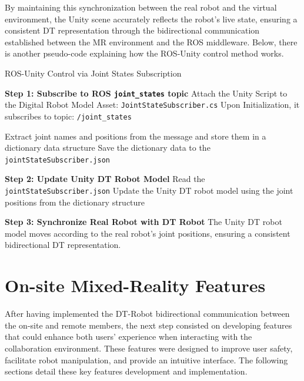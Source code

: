     By maintaining this synchronization between the real robot and the virtual environment, the Unity scene accurately reflects the robot's live state, ensuring a consistent \ac{DT} representation through the bidirectional communication established between the \ac{MR} environment and the \ac{ROS} middleware. Below, there is another pseudo-code explaining how the \ac{ROS}-Unity control method works.


    \begin{algorithm}
        \caption{ROS-Unity Control via Joint States Subscription}\label{alg:ros_unity_control}
        \begin{algorithmic}[1]
            \State \textbf{Step 1: Subscribe to ROS \texttt{joint\_states} topic}
            \State Attach the Unity Script to the Digital Robot Model Asset: \texttt{JointStateSubscriber.cs}
            \State Upon Initialization, it subscribes to topic: \texttt{/joint\_states}
    
                \State Extract joint names and positions from the message and store them in a dictionary data structure
                \State Save the dictionary data to the \texttt{jointStateSubscriber.json}
            \EndWhile
    
            \State \textbf{Step 2: Update Unity \ac{DT} Robot Model}
                \State Read the \texttt{jointStateSubscriber.json}
                \State Update the Unity \ac{DT} robot model using the joint positions from the dictionary structure
            \EndWhile
    
            \State \textbf{Step 3: Synchronize Real Robot with \ac{DT} Robot}
            \State The Unity \ac{DT} robot model moves according to the real robot’s joint positions, ensuring a consistent bidirectional \ac{DT} representation.
        \end{algorithmic}
    \end{algorithm}
    

 
\section{On-site Mixed-Reality Features}
\label{section:on-site-features}
After having implemented the \ac{DT}-Robot bidirectional communication between the on-site and remote members, the next step consisted on developing features that could enhance both users' experience when interacting with the collaboration environment. These features were designed to improve user safety, facilitate robot manipulation, and provide an intuitive interface. The following sections detail these key features development and implementation.

